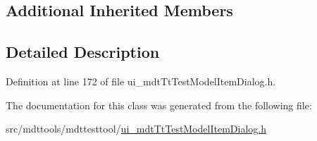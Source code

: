 \subsection*{Additional Inherited Members}


\subsection{Detailed Description}


Definition at line 172 of file ui\-\_\-mdt\-Tt\-Test\-Model\-Item\-Dialog.\-h.



The documentation for this class was generated from the following file\-:\begin{DoxyCompactItemize}
\item 
src/mdttools/mdttesttool/\hyperlink{ui__mdt_tt_test_model_item_dialog_8h}{ui\-\_\-mdt\-Tt\-Test\-Model\-Item\-Dialog.\-h}\end{DoxyCompactItemize}
